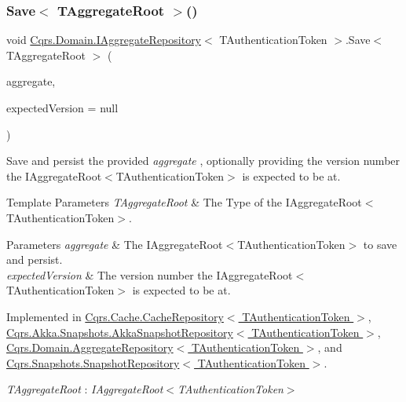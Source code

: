 \subsubsection{\texorpdfstring{Save$<$ T\+Aggregate\+Root $>$()}{Save< TAggregateRoot >()}}
{\footnotesize\ttfamily void \hyperlink{interfaceCqrs_1_1Domain_1_1IAggregateRepository}{Cqrs.\+Domain.\+I\+Aggregate\+Repository}$<$ T\+Authentication\+Token $>$.Save$<$ T\+Aggregate\+Root $>$ (\begin{DoxyParamCaption}\item[{T\+Aggregate\+Root}]{aggregate,  }\item[{int?}]{expected\+Version = {\ttfamily null} }\end{DoxyParamCaption})}



Save and persist the provided {\itshape aggregate} , optionally providing the version number the I\+Aggregate\+Root$<$\+T\+Authentication\+Token$>$ is expected to be at. 


\begin{DoxyTemplParams}{Template Parameters}
{\em T\+Aggregate\+Root} & The Type of the I\+Aggregate\+Root$<$\+T\+Authentication\+Token$>$.\\
\hline
\end{DoxyTemplParams}

\begin{DoxyParams}{Parameters}
{\em aggregate} & The I\+Aggregate\+Root$<$\+T\+Authentication\+Token$>$ to save and persist.\\
\hline
{\em expected\+Version} & The version number the I\+Aggregate\+Root$<$\+T\+Authentication\+Token$>$ is expected to be at.\\
\hline
\end{DoxyParams}


Implemented in \hyperlink{classCqrs_1_1Cache_1_1CacheRepository_a69df7ee1dc2e4cd38431ab987655eab3_a69df7ee1dc2e4cd38431ab987655eab3}{Cqrs.\+Cache.\+Cache\+Repository$<$ T\+Authentication\+Token $>$}, \hyperlink{classCqrs_1_1Akka_1_1Snapshots_1_1AkkaSnapshotRepository_adf399a4ea283ae725bf8f1229d6da30a_adf399a4ea283ae725bf8f1229d6da30a}{Cqrs.\+Akka.\+Snapshots.\+Akka\+Snapshot\+Repository$<$ T\+Authentication\+Token $>$}, \hyperlink{classCqrs_1_1Domain_1_1AggregateRepository_aff9e828d19a091a4275f635bee4b3c9b_aff9e828d19a091a4275f635bee4b3c9b}{Cqrs.\+Domain.\+Aggregate\+Repository$<$ T\+Authentication\+Token $>$}, and \hyperlink{classCqrs_1_1Snapshots_1_1SnapshotRepository_aac1a574562f8c6134d02a44cd10b8afa_aac1a574562f8c6134d02a44cd10b8afa}{Cqrs.\+Snapshots.\+Snapshot\+Repository$<$ T\+Authentication\+Token $>$}.

\begin{Desc}
\item[Type Constraints]\begin{description}
\item[{\em T\+Aggregate\+Root} : {\em I\+Aggregate\+Root$<$T\+Authentication\+Token$>$}]\end{description}
\end{Desc}
